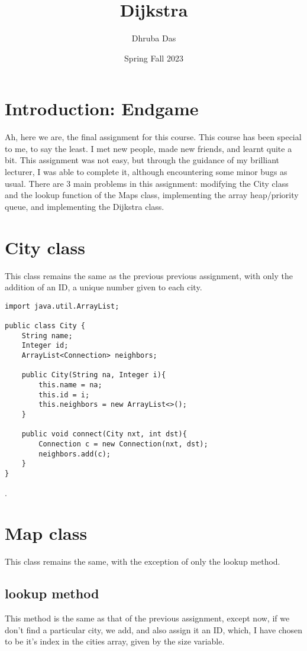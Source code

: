 \documentclass[a4paper,11pt]{article}
\begin{document}
\title{
    \textbf{Dijkstra}
}
\author{Dhruba Das}
\date{Spring Fall 2023}

\maketitle

\section*{Introduction: Endgame}
Ah, here we are, the final assignment for this course. 
This course has been special to me, to say the least. I met new people, made new friends, and learnt quite a bit. This assignment was not easy, but through the guidance of my brilliant lecturer, I was able to complete it, although encountering some minor bugs as usual. There are 3 main problems in this assignment: modifying the City class and the lookup function of the Maps class, implementing the array heap/priority queue, and implementing the Dijkstra class. 


\section*{City class}
This class remains the same as the previous previous assignment, with only the addition of an ID, a unique number given to each city. 

\begin{verbatim}
import java.util.ArrayList;

public class City {
    String name;
    Integer id;
    ArrayList<Connection> neighbors;

    public City(String na, Integer i){
        this.name = na;
        this.id = i;
        this.neighbors = new ArrayList<>();
    }

    public void connect(City nxt, int dst){
        Connection c = new Connection(nxt, dst);
        neighbors.add(c);
    }
}
\end{verbatim}.


\section*{Map class}
This class remains the same, with the exception of only the lookup method.

\subsection*{lookup method}
This method is the same as that of the previous assignment, except now, if we don't find a particular city, we add, and also assign it an ID, which, I have chosen to be it's index in the cities array, given by the size variable.
\end{document}
